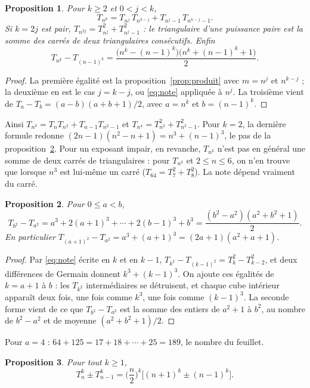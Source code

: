 \documentclass[11pt,a4paper]{article}
\newtheorem{proposition}{Proposition}
\theoremstyle{remark}
\begin{document}
\begin{proposition}\label{prop:puissance-n}
Pour $k \geq 2$ et $0 < j < k$,
\[
T_{n^k} = T_{n^j}\,T_{n^{k-j}} + T_{n^j - 1}\,T_{n^{k-j} - 1}.
\]
Si $k = 2j$ est pair, $T_{n^{2j}} = T_{n^j}^2 + T_{n^j - 1}^2$ : le
triangulaire d'une puissance paire est la somme des carrés de deux
triangulaires consécutifs. Enfin
\[
T_{n^k} - T_{(n-1)^k}
= \frac{\big(n^k - (n-1)^k\big)\big(n^k + (n-1)^k + 1\big)}{2}.
\]
\end{proposition}

\begin{proof}
La première égalité est la proposition~\ref{prop:produit} avec $m = n^j$ et
$n^{k-j}$ ; la deuxième en est le cas $j = k - j$, ou \eqref{eq:note}
appliquée à $n^j$. La troisième vient de $T_a - T_b = (a-b)(a+b+1)/2$, avec
$a = n^k$ et $b = (n-1)^k$.
\end{proof}

Ainsi $T_{n^3} = T_n T_{n^2} + T_{n-1} T_{n^2-1}$ et
$T_{n^4} = T_{n^2}^2 + T_{n^2-1}^2$. Pour $k = 2$, la dernière formule
redonne $(2n-1)(n^2-n+1) = n^3 + (n-1)^3$, le pas de la
proposition~\ref{prop:pas}. Pour un exposant impair, en revanche, $T_{n^k}$
n'est pas en général une somme de deux carrés de triangulaires : pour
$T_{n^3}$ et $2 \leq n \leq 6$, on n'en trouve que lorsque $n^3$ est
lui-même un carré ($T_{64} = T_7^2 + T_8^2$). La note dépend vraiment du
carré.

\begin{proposition}\label{prop:pas}
Pour $0 \leq a < b$,
\[
T_{b^2} - T_{a^2} = a^3 + 2(a+1)^3 + \cdots + 2(b-1)^3 + b^3
= \frac{(b^2 - a^2)(a^2 + b^2 + 1)}{2}.
\]
En particulier $T_{(a+1)^2} - T_{a^2} = a^3 + (a+1)^3 = (2a+1)(a^2+a+1)$.
\end{proposition}

\begin{proof}
Par \eqref{eq:note} écrite en $k$ et en $k-1$,
$T_{k^2} - T_{(k-1)^2} = T_k^2 - T_{k-2}^2$, et deux différences de Germain
donnent $k^3 + (k-1)^3$. On ajoute ces égalités de $k = a+1$ à $b$ : les
$T_{k^2}$ intermédiaires se détruisent, et chaque cube intérieur apparaît
deux fois, une fois comme $k^3$, une fois comme $(k-1)^3$. La seconde forme
vient de ce que $T_{b^2} - T_{a^2}$ est la somme des entiers de $a^2 + 1$ à
$b^2$, au nombre de $b^2 - a^2$ et de moyenne $(a^2 + b^2 + 1)/2$.
\end{proof}

Pour $a = 4$ : $64 + 125 = 17 + 18 + \cdots + 25 = 189$, le nombre du
feuillet.

\begin{proposition}\label{prop:puissances}
Pour tout $k \geq 1$,
\[
T_n^k \pm T_{n-1}^k = \Big(\frac{n}{2}\Big)^{k}\big[(n+1)^k \pm (n-1)^k\big].
\]
\end{proposition}
\end{document}
